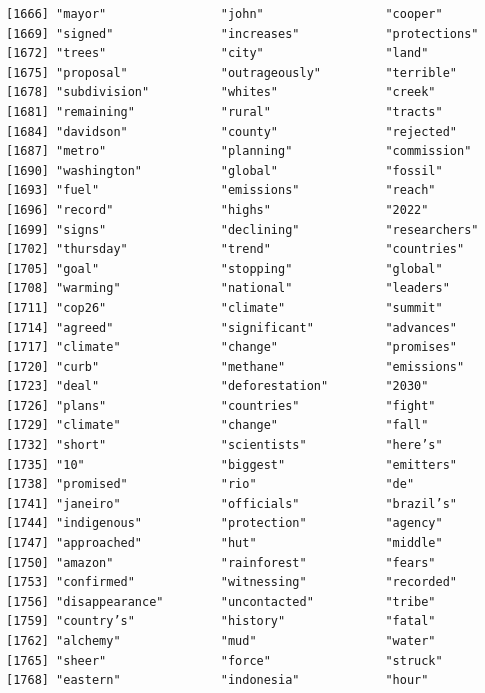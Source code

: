\documentclass[
  letterpaper,
  DIV=11,
  numbers=noendperiod]{scrartcl}
\begin{document}
\begin{verbatim}
[1666] "mayor"                "john"                 "cooper"              
[1669] "signed"               "increases"            "protections"         
[1672] "trees"                "city"                 "land"                
[1675] "proposal"             "outrageously"         "terrible"            
[1678] "subdivision"          "whites"               "creek"               
[1681] "remaining"            "rural"                "tracts"              
[1684] "davidson"             "county"               "rejected"            
[1687] "metro"                "planning"             "commission"          
[1690] "washington"           "global"               "fossil"              
[1693] "fuel"                 "emissions"            "reach"               
[1696] "record"               "highs"                "2022"                
[1699] "signs"                "declining"            "researchers"         
[1702] "thursday"             "trend"                "countries"           
[1705] "goal"                 "stopping"             "global"              
[1708] "warming"              "national"             "leaders"             
[1711] "cop26"                "climate"              "summit"              
[1714] "agreed"               "significant"          "advances"            
[1717] "climate"              "change"               "promises"            
[1720] "curb"                 "methane"              "emissions"           
[1723] "deal"                 "deforestation"        "2030"                
[1726] "plans"                "countries"            "fight"               
[1729] "climate"              "change"               "fall"                
[1732] "short"                "scientists"           "here’s"              
[1735] "10"                   "biggest"              "emitters"            
[1738] "promised"             "rio"                  "de"                  
[1741] "janeiro"              "officials"            "brazil’s"            
[1744] "indigenous"           "protection"           "agency"              
[1747] "approached"           "hut"                  "middle"              
[1750] "amazon"               "rainforest"           "fears"               
[1753] "confirmed"            "witnessing"           "recorded"            
[1756] "disappearance"        "uncontacted"          "tribe"               
[1759] "country’s"            "history"              "fatal"               
[1762] "alchemy"              "mud"                  "water"               
[1765] "sheer"                "force"                "struck"              
[1768] "eastern"              "indonesia"            "hour"                

\end{verbatim}
\end{document}
